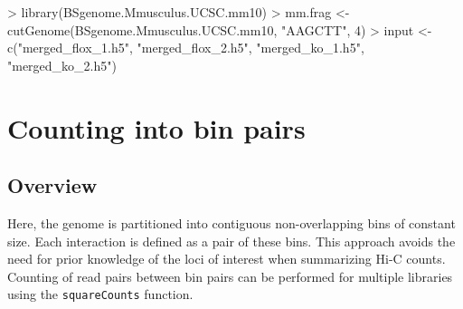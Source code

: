\documentclass[12pt]{report}
\renewenvironment{Schunk}{\vspace{0pt}}{\vspace{0pt}}
\newcommand{\code}[1]{{\small\texttt{#1}}}
\begin{document}
\begin{Schunk}
\begin{Sinput}
> library(BSgenome.Mmusculus.UCSC.mm10)
> mm.frag <- cutGenome(BSgenome.Mmusculus.UCSC.mm10, "AAGCTT", 4)
> input <- c("merged_flox_1.h5", "merged_flox_2.h5", "merged_ko_1.h5", "merged_ko_2.h5")
\end{Sinput}
\end{Schunk}

\section{Counting into bin pairs}

\subsection{Overview}
Here, the genome is partitioned into contiguous non-overlapping bins of constant size.
Each interaction is defined as a pair of these bins.
This approach avoids the need for prior knowledge of the loci of interest when summarizing Hi-C counts.
Counting of read pairs between bin pairs can be performed for multiple libraries using the \code{squareCounts} function.
\end{document}
